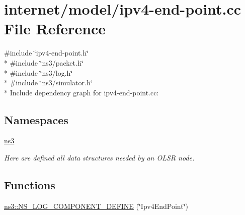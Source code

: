 \hypertarget{ipv4-end-point_8cc}{}\section{internet/model/ipv4-\/end-\/point.cc File Reference}
\label{ipv4-end-point_8cc}
{\ttfamily \#include \char`\"{}ipv4-\/end-\/point.\+h\char`\"{}}\\*
{\ttfamily \#include \char`\"{}ns3/packet.\+h\char`\"{}}\\*
{\ttfamily \#include \char`\"{}ns3/log.\+h\char`\"{}}\\*
{\ttfamily \#include \char`\"{}ns3/simulator.\+h\char`\"{}}\\*
Include dependency graph for ipv4-\/end-\/point.cc\+:
\subsection*{Namespaces}
\begin{DoxyCompactItemize}
\item 
 \hyperlink{namespacens3}{ns3}
\begin{DoxyCompactList}\small\item\em Here are defined all data structures needed by an O\+L\+SR node. \end{DoxyCompactList}\end{DoxyCompactItemize}
\subsection*{Functions}
\begin{DoxyCompactItemize}
\item 
\hyperlink{namespacens3_a367dacc0e4b1e6f3e8290a45134b7dcd}{ns3\+::\+N\+S\+\_\+\+L\+O\+G\+\_\+\+C\+O\+M\+P\+O\+N\+E\+N\+T\+\_\+\+D\+E\+F\+I\+NE} (\char`\"{}Ipv4\+End\+Point\char`\"{})
\end{DoxyCompactItemize}
